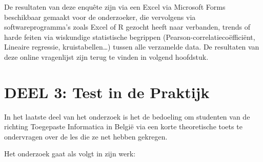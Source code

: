 De resultaten van deze enquête zijn via een Excel via Microsoft Forms beschikbaar gemaakt voor de onderzoeker, die vervolgens via softwareprogramma’s zoals Excel of R gezocht heeft naar verbanden, trends of harde feiten via wiskundige statistische begrippen (Pearson-correlatiecoëfficiënt, Lineaire regressie, kruistabellen…) tussen alle verzamelde data. De resultaten van deze online vragenlijst zijn terug te vinden in volgend hoofdstuk.

\section{DEEL 3: Test in de Praktijk}
\label{sec:praktijk}

In het laatste deel van het onderzoek is het de bedoeling om studenten van de richting Toegepaste Informatica in België via een korte theoretische toets te ondervragen over de les die ze net hebben gekregen.

Het onderzoek gaat als volgt in zijn werk:

